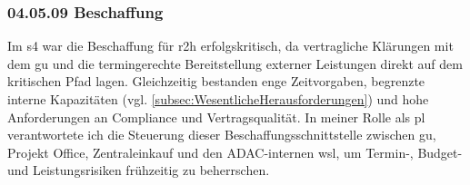 \subsubsection*{04.05.09 Beschaffung} 
\label{sec:04.05.09.Beschaffung}

\par Im \gls{s4} war die Beschaffung für \gls{r2h} erfolgskritisch, da vertragliche Klärungen mit dem \gls{gu} und die termingerechte Bereitstellung externer Leistungen direkt auf dem kritischen Pfad lagen. Gleichzeitig bestanden enge Zeitvorgaben, begrenzte interne Kapazitäten (vgl. \autoref{subsec:WesentlicheHerausforderungen}) und hohe Anforderungen an Compliance und Vertragsqualität. In meiner Rolle als \gls{pl} verantwortete ich die Steuerung dieser Beschaffungsschnittstelle zwischen \gls{gu}, Projekt Office, Zentraleinkauf und den ADAC-internen \gls{wsl}, um Termin-, Budget- und Leistungsrisiken frühzeitig zu beherrschen.